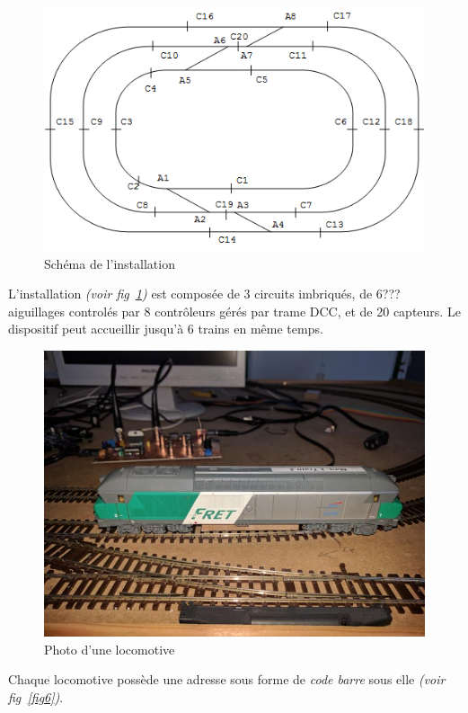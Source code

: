 \begin{figure}[h]
\centering
\includegraphics[scale=0.80]{circuit.png}
\caption{Sch\'ema de l'installation}
\label{fig4}
\end{figure}

L'installation \emph{(voir fig~\ref{fig4})} est compos\'ee de 3
circuits imbriqués, de 6??? aiguillages control\'es par 8
contr\^oleurs gérés par trame DCC, et de 20 capteurs.
Le dispositif peut accueillir jusqu'\`a 6 trains en m\^eme temps.

\begin{figure}[h]
\centering
\includegraphics[scale=0.3]{loco.jpg}
\caption{Photo d'une locomotive}
\label{fig5}
\end{figure}

Chaque locomotive poss\`ede une adresse sous forme de \emph{code
barre} sous elle \emph{(voir fig~\ref{fig6})}.

